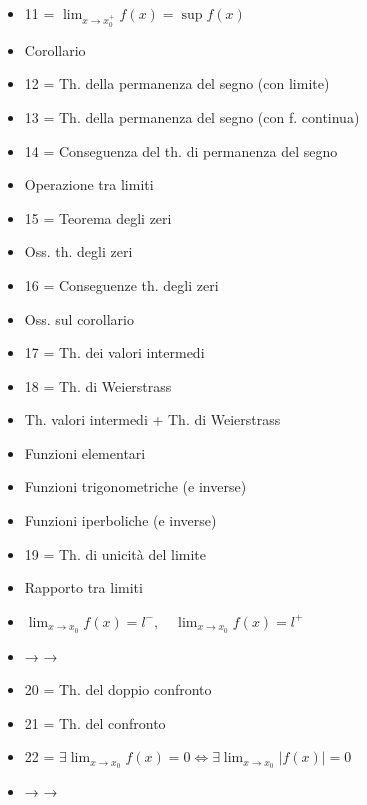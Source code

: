 \begin{itemize}
\item 11 = $\lim_{x\to x_0^+}f(x)=\sup f(x)$
\item Corollario
\item 12 = Th. della permanenza del segno (con limite)
\item 13 = Th. della permanenza del segno (con f. continua)
\item 14 = Conseguenza del th. di permanenza del segno
\item Operazione tra limiti
\item 15 = Teorema degli zeri
\item Oss. th. degli zeri
\item 16 = Conseguenze th. degli zeri
\item Oss. sul corollario
\item 17 = Th. dei valori intermedi
\item 18 = Th. di Weierstrass
\item Th. valori intermedi + Th. di Weierstrass
\item Funzioni elementari
\item Funzioni trigonometriche (e inverse)
\item Funzioni iperboliche (e inverse)
\item 19 = Th. di unicità del limite
\item Rapporto tra limiti
\item $\lim_{x\to x_0}f(x)=l^-,\quad\lim_{x\to x_0}f(x)=l^+$
\item →               →
\item 20 = Th. del doppio confronto
\item 21 = Th. del confronto
\item 22 = $\exists\lim_{x\to x_0}f(x)=0\iff\exists\lim_{x\to x_0}|f(x)|=0$
\item →             →
\end{itemize}
